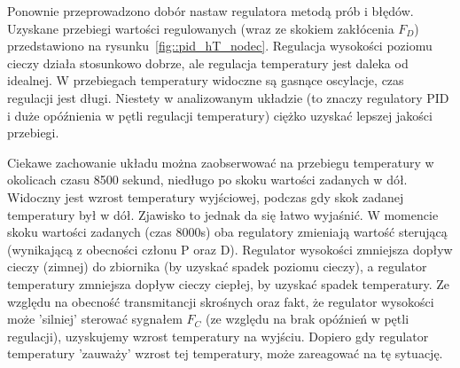 \documentclass{article}
\begin{document}
Ponownie przeprowadzono dobór nastaw regulatora metodą prób i błędów. Uzyskane przebiegi wartości regulowanych (wraz ze skokiem zakłócenia $F_D$) przedstawiono na rysunku~\ref{fig::pid_hT_nodec}. Regulacja wysokości poziomu cieczy działa stosunkowo dobrze, ale regulacja temperatury jest daleka od idealnej. W przebiegach temperatury widoczne są gasnące oscylacje, czas regulacji jest długi. Niestety w analizowanym układzie (to znaczy regulatory PID i duże opóźnienia w pętli regulacji temperatury) ciężko uzyskać lepszej jakości przebiegi.

Ciekawe zachowanie układu można zaobserwować na przebiegu temperatury w okolicach czasu 8500 sekund, niedługo po skoku wartości zadanych w dół. Widoczny jest wzrost temperatury wyjściowej, podczas gdy skok zadanej temperatury był w dół. Zjawisko to jednak da się łatwo wyjaśnić. W momencie skoku wartości zadanych (czas 8000s) oba regulatory zmieniają wartość sterującą (wynikającą z obecności członu P oraz D). Regulator wysokości zmniejsza dopływ cieczy (zimnej) do zbiornika (by uzyskać spadek poziomu cieczy), a regulator temperatury zmniejsza dopływ cieczy ciepłej, by uzyskać spadek temperatury. Ze względu na obecność transmitancji skrośnych oraz fakt, że regulator wysokości może 'silniej' sterować sygnałem $F_C$ (ze względu na brak opóźnień w pętli regulacji), uzyskujemy wzrost temperatury na wyjściu. Dopiero gdy regulator temperatury 'zauważy' wzrost tej temperatury, może zareagować na tę sytuację.

\newpage
\end{document}
